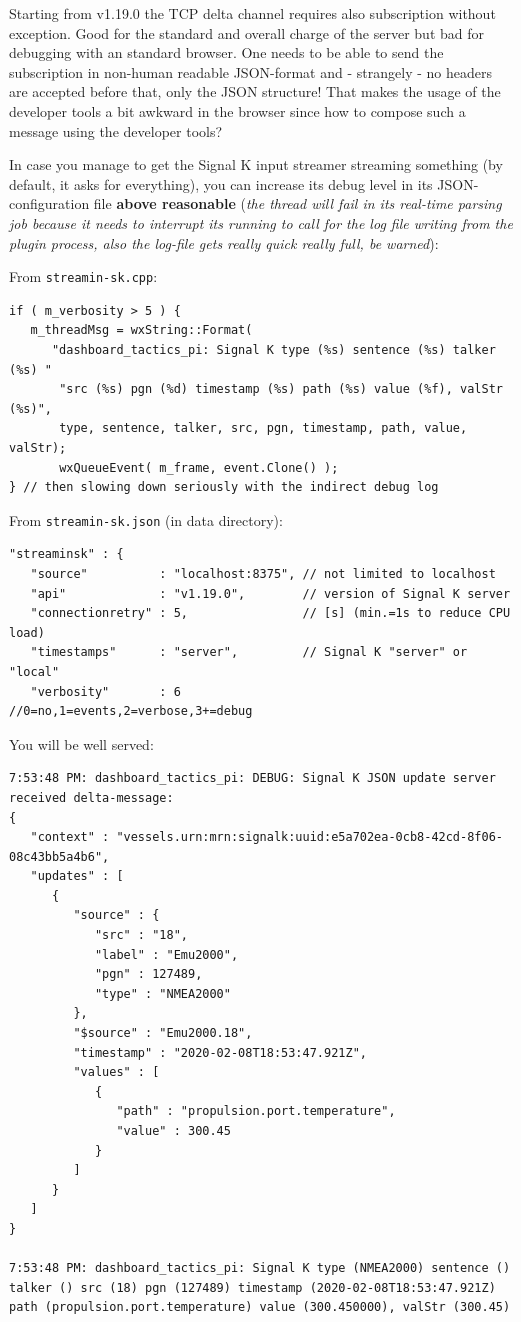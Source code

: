 \documentclass[11pt]{article}
\begin{document}
    Starting from v1.19.0 the TCP delta channel requires also subscription
without exception. Good for the standard and overall charge of the
server but bad for debugging with an standard browser. One needs to be
able to send the subscription in non-human readable JSON-format and -
strangely - no headers are accepted before that, only the JSON
structure! That makes the usage of the developer tools a bit awkward in
the browser since how to compose such a message using the developer
tools?

    In case you manage to get the Signal K input streamer streaming
something (by default, it asks for everything), you can increase its
debug level in its JSON-configuration file \textbf{above reasonable}
(\emph{the thread will fail in its real-time parsing job because it
needs to interrupt its running to call for the log file writing from the
plugin process, also the log-file gets really quick really full, be
warned}):

    From \texttt{streamin-sk.cpp}:

\begin{verbatim}
if ( m_verbosity > 5 ) {
   m_threadMsg = wxString::Format(
      "dashboard_tactics_pi: Signal K type (%s) sentence (%s) talker (%s) "
       "src (%s) pgn (%d) timestamp (%s) path (%s) value (%f), valStr (%s)",
       type, sentence, talker, src, pgn, timestamp, path, value, valStr);
       wxQueueEvent( m_frame, event.Clone() );
} // then slowing down seriously with the indirect debug log
\end{verbatim}

    From \texttt{streamin-sk.json} (in data directory):

\begin{verbatim}
"streaminsk" : {
   "source"          : "localhost:8375", // not limited to localhost
   "api"             : "v1.19.0",        // version of Signal K server
   "connectionretry" : 5,                // [s] (min.=1s to reduce CPU load)
   "timestamps"      : "server",         // Signal K "server" or "local"
   "verbosity"       : 6                 //0=no,1=events,2=verbose,3+=debug
\end{verbatim}

    You will be well served:

    \begin{verbatim}
7:53:48 PM: dashboard_tactics_pi: DEBUG: Signal K JSON update server received delta-message:
{
   "context" : "vessels.urn:mrn:signalk:uuid:e5a702ea-0cb8-42cd-8f06-08c43bb5a4b6",
   "updates" : [
      {
         "source" : {
            "src" : "18",
            "label" : "Emu2000",
            "pgn" : 127489,
            "type" : "NMEA2000"
         },
         "$source" : "Emu2000.18",
         "timestamp" : "2020-02-08T18:53:47.921Z",
         "values" : [
            {
               "path" : "propulsion.port.temperature",
               "value" : 300.45
            }
         ]
      }
   ]
}

7:53:48 PM: dashboard_tactics_pi: Signal K type (NMEA2000) sentence () talker () src (18) pgn (127489) timestamp (2020-02-08T18:53:47.921Z) path (propulsion.port.temperature) value (300.450000), valStr (300.45)
\end{verbatim}
\end{document}
